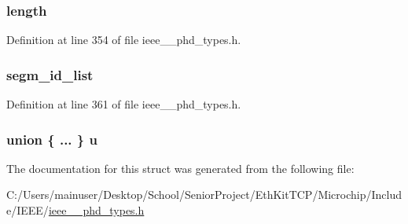 \subsubsection[{length}]{ length}\label{struct___segm_selection_a3743679e4ff85e3e1b3fc2e59973fbb3}


Definition at line 354 of file ieee\+\_\+\_\+phd\+\_\+types.\+h.

\hypertarget{struct___segm_selection_a449adfe911e3249f661fd9bccd99b46c}{}
\subsubsection[{segm\+\_\+id\+\_\+list}]{ segm\+\_\+id\+\_\+list}\label{struct___segm_selection_a449adfe911e3249f661fd9bccd99b46c}


Definition at line 361 of file ieee\+\_\+\_\+phd\+\_\+types.\+h.

\hypertarget{struct___segm_selection_a1295494d29197288044b24e5c654882f}{}
\subsubsection[{u}]{\setlength{\rightskip}{0pt plus 5cm}union \{ ... \}   u}\label{struct___segm_selection_a1295494d29197288044b24e5c654882f}


The documentation for this struct was generated from the following file\+:\begin{DoxyCompactItemize}
\item 
C\+:/\+Users/mainuser/\+Desktop/\+School/\+Senior\+Project/\+Eth\+Kit\+T\+C\+P/\+Microchip/\+Include/\+I\+E\+E\+E/\hyperlink{ieee__11073__phd__types_8h}{ieee\+\_\+\_\+phd\+\_\+types.\+h}\end{DoxyCompactItemize}
